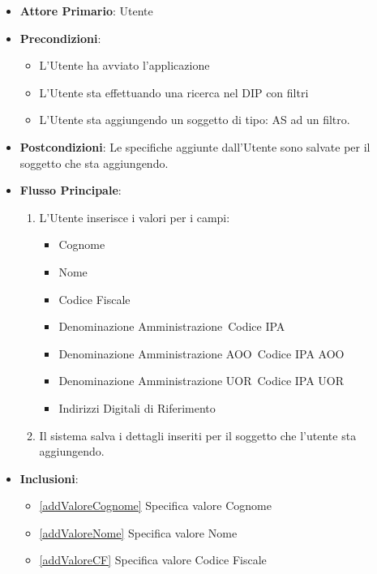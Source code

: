 \begin{itemize}
      \item \textbf{Attore Primario}: Utente
      \item \textbf{Precondizioni}:\begin{itemize}
            \item L'Utente ha avviato l'applicazione
            \item L'Utente sta effettuando una ricerca nel DIP con filtri
            \item L'Utente sta aggiungendo un soggetto di tipo: AS ad un filtro.
            \end{itemize}
      \item \textbf{Postcondizioni}:  Le specifiche aggiunte dall'Utente sono salvate per il soggetto che sta aggiungendo.
      \item \textbf{Flusso Principale}:
            \begin{enumerate}
                  \item L'Utente inserisce i valori per i campi:
                        \begin{itemize}
                              \item Cognome
                              \item Nome
                              \item Codice Fiscale
                              \item Denominazione Amministrazione\ Codice IPA
                              \item Denominazione Amministrazione AOO\ Codice IPA AOO
                              \item Denominazione Amministrazione UOR\ Codice IPA UOR
                              \item Indirizzi Digitali di Riferimento
                        \end{itemize}
                  \item Il sistema salva i dettagli inseriti per il soggetto che l'utente sta aggiungendo.
            \end{enumerate}
      \item \textbf{Inclusioni}: \begin{itemize}
            \item \ref{addValoreCognome} Specifica valore Cognome
            \item \ref{addValoreNome} Specifica valore Nome
            \item \ref{addValoreCF} Specifica valore Codice Fiscale

\end{itemize}
\end{itemize}
